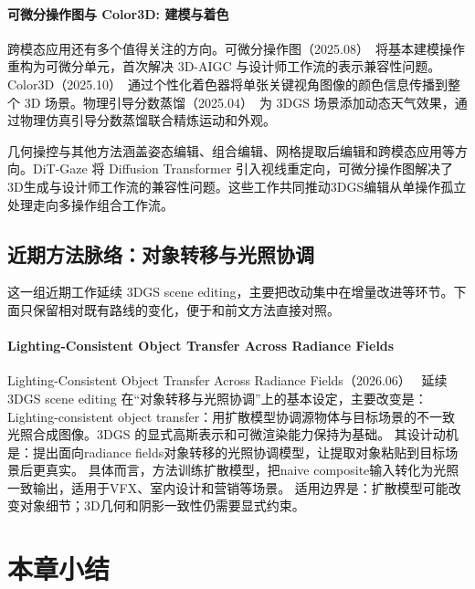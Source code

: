 \paragraph{可微分操作图与 Color3D: 建模与着色}

跨模态应用还有多个值得关注的方向。可微分操作图（2025.08）~\cite{2508_17645}将基本建模操作重构为可微分单元，首次解决 3D-AIGC 与设计师工作流的表示兼容性问题。Color3D（2025.10）~\cite{2510_10152}通过个性化着色器将单张关键视角图像的颜色信息传播到整个 3D 场景。物理引导分数蒸馏（2025.04）~\cite{2504_05296}为 3DGS 场景添加动态天气效果，通过物理仿真引导分数蒸馏联合精炼运动和外观。

\begin{takeaway}
几何操控与其他方法涵盖姿态编辑、组合编辑、网格提取后编辑和跨模态应用等方向。DiT-Gaze 将 Diffusion Transformer 引入视线重定向，可微分操作图解决了3D生成与设计师工作流的兼容性问题。这些工作共同推动3DGS编辑从单操作孤立处理走向多操作组合工作流。
\end{takeaway}


\subsection{近期方法脉络：对象转移与光照协调}

这一组近期工作延续 3DGS scene editing，主要把改动集中在增量改进等环节。下面只保留相对既有路线的变化，便于和前文方法直接对照。

\paragraph{Lighting-Consistent Object Transfer Across Radiance Fields}
Lighting-Consistent Object Transfer Across Radiance Fields（2026.06）~\cite{2606_22481} 延续 3DGS scene editing 在“对象转移与光照协调”上的基本设定，主要改变是：Lighting-consistent object transfer：用扩散模型协调源物体与目标场景的不一致光照合成图像。3DGS 的显式高斯表示和可微渲染能力保持为基础。
其设计动机是：提出面向radiance fields对象转移的光照协调模型，让提取对象粘贴到目标场景后更真实。
具体而言，方法训练扩散模型，把naive composite输入转化为光照一致输出，适用于VFX、室内设计和营销等场景。
适用边界是：扩散模型可能改变对象细节；3D几何和阴影一致性仍需要显式约束。



\section*{本章小结}

